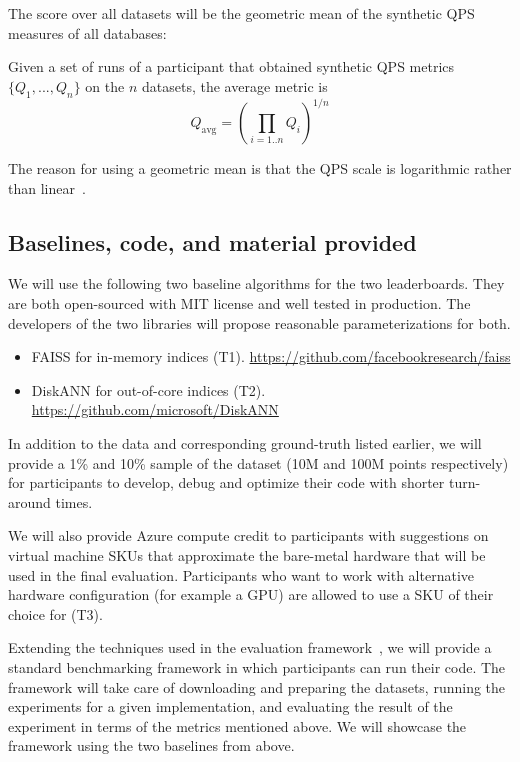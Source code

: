 The score over all datasets will be the geometric mean of the synthetic QPS measures of all databases:
\begin{definition}
  \label{def:averagedmetric}
  Given a set of runs of a participant that obtained synthetic QPS metrics $\{Q_1,...,Q_n\}$ on the $n$ datasets, the average metric is 
  \[
  Q_\mathrm{avg} = \left( 
\prod_{i=1..n} Q_i
  \right)^{1/n} 
  \]
\end{definition}
% 
The reason for using a geometric mean is that the QPS scale is logarithmic rather than linear~\cite{Benchmark,FaissBenchmarks}.

\fi 

\subsection{Baselines, code, and material provided}

We will use the following two baseline algorithms for the two
leaderboards.  They are both open-sourced with MIT license and well
tested in production.
The developers of the two libraries will propose reasonable parameterizations for both.
\begin{itemize}
  \item FAISS for in-memory indices (T1). 
    \url{https://github.com/facebookresearch/faiss}
  \item DiskANN for out-of-core indices (T2).
    \url{https://github.com/microsoft/DiskANN}
\end{itemize}


In addition to the data and corresponding ground-truth listed earlier,
we will provide a 1\% and 10\% sample of the dataset (10M and
100M points respectively) for participants to develop, debug and
optimize their code with shorter turn-around times.

We will also provide Azure compute credit to participants with
suggestions on virtual machine SKUs that approximate the bare-metal
hardware that will be used in the final evaluation.  Participants who
want to work with alternative hardware configuration (for example a
GPU) are allowed to use a SKU of their choice for (T3).

Extending the techniques used in the evaluation framework~\cite{Benchmark}, 
we will provide a standard benchmarking framework in which participants can 
run their code.
The framework will take care of downloading and preparing the datasets,
running the experiments for a given implementation, 
and evaluating the result of the experiment in terms of the metrics mentioned above.
We will showcase the framework using the two baselines from above.


